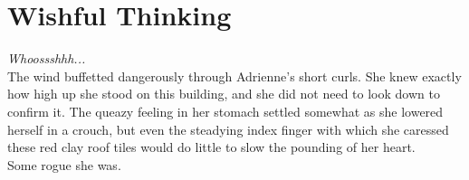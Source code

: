 \chapter{Wishful Thinking}

\textit{Whoossshhh...}\\

The wind buffetted dangerously through Adrienne's short curls. 
She knew exactly how high up she stood on this building, and she did not need to look down to confirm it.
The queazy feeling in her stomach settled somewhat as she lowered herself in a crouch, 
but even the steadying index finger with which she caressed these red clay roof tiles would do little to slow the pounding of her heart.\\

Some rogue she was.\\